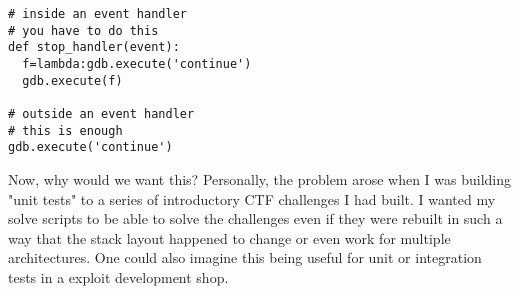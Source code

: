 \documentclass[twocolumn]{article}
\begin{document}
\begin{verbatim}
# inside an event handler
# you have to do this
def stop_handler(event):
  f=lambda:gdb.execute('continue')
  gdb.execute(f)

# outside an event handler
# this is enough
gdb.execute('continue')
\end{verbatim}

Now, why would we want this? Personally, the problem arose when I was building "unit tests" to a series of introductory CTF challenges I had built. I wanted my solve scripts to be able to solve the challenges even if they were rebuilt in such a way that the stack layout happened to change or even work for multiple architectures. One could also imagine this being useful for unit or integration tests in a exploit development shop.

\end{document}
